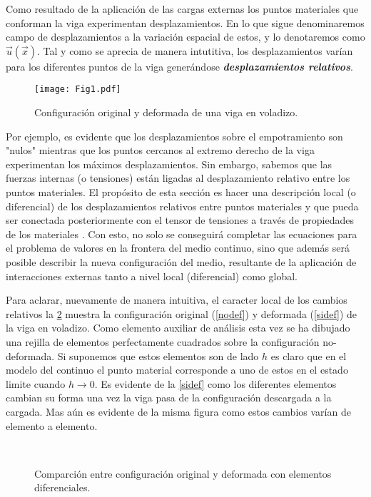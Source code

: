 \documentclass[../notas medios.tex]{subfiles}
\begin{document}
Como resultado de la aplicación de las cargas externas los puntos materiales que conforman la viga experimentan desplazamientos. En lo que sigue denominaremos campo de desplazamientos a la variación espacial de estos, y lo denotaremos como $\vec u(\vec x)$. Tal y como se aprecia de manera intutitiva, los desplazamientos varían para los diferentes puntos de la viga generándose \textbf{\textit{desplazamientos relativos}}.

\begin{figure}[H]
\centering
	\texttt{[image: Fig1.pdf]}
	\caption{Configuración original y deformada de una viga en voladizo.}
	\label{viga1}
\end{figure}


Por ejemplo, es evidente que los desplazamientos sobre el empotramiento son "nulos" mientras que los puntos cercanos al extremo derecho de la viga experimentan los máximos desplazamientos. Sin embargo, sabemos que las fuerzas internas (o tensiones) están ligadas al desplazamiento relativo entre los puntos materiales. El propósito de esta sección es hacer una descripción local (o diferencial) de los desplazamientos relativos entre puntos materiales y que pueda ser conectada posteriormente con el tensor de tensiones a través de propiedades de los materiales . Con esto, no solo se conseguirá completar las ecuaciones para el problema de valores en la frontera del medio continuo, sino que además será posible describir la nueva configuración del medio, resultante de la aplicación de interacciones externas tanto a nivel local (diferencial) como global.

Para aclarar, nuevamente de manera intuitiva, el caracter local de los cambios relativos la \cref{steady_state} muestra la configuración original (\cref{nodef}) y deformada (\cref{sidef}) de la viga en voladizo. Como elemento auxiliar de análisis esta vez se ha dibujado una rejilla de elementos perfectamente cuadrados sobre la configuración no-deformada.   Si suponemos que estos elementos son de lado $h$ es claro que en el modelo del continuo el punto material corresponde a uno de estos en el estado limite cuando $h \to 0.$ Es evidente de la \cref{sidef} como los diferentes elementos cambian su forma una vez la viga pasa de la configuración descargada a la cargada. Mas aún es evidente de la misma figura como estos cambios varían de elemento a elemento.

\begin{figure}[H]
     \centering
     \hspace{0.5cm}\\
     \caption{Comparción entre configuración original y deformada con elementos diferenciales.}
     \label{steady_state}
\end{figure}
\end{document}
